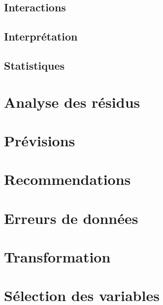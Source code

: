 \documentclass{article}\usepackage[]{graphicx}\usepackage[]{color}
\begin{document}
\subsection{Interactions}
\label{ssec:interaction}

\subsection{Interprétation}
\label{ssec:interpretation}

\subsection{Statistiques}
\label{ssec:stats}

\section{Analyse des résidus}
\label{sec:analyse}

\section{Prévisions}
\label{sec:prev}

\section{Recommendations}


\begin{appendices}
\section{Erreurs de données}

\section{Transformation}

\section{Sélection des variables}
\end{appendices}
\end{document}
